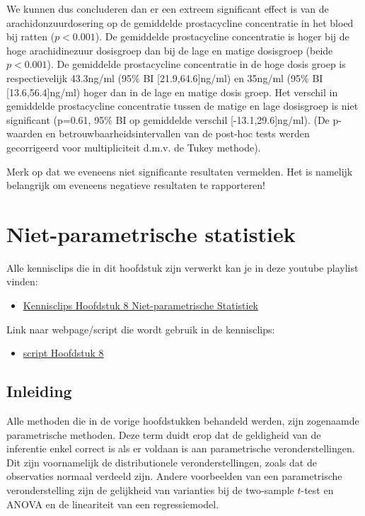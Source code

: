 \documentclass[
  12pt,dutch,coursenotes]{book}
\providecommand{\tightlist}{%
  \setlength{\itemsep}{0pt}\setlength{\parskip}{0pt}}
\theoremstyle{definition}
\theoremstyle{definition}
\theoremstyle{definition}
\theoremstyle{definition}
\theoremstyle{remark}
\begin{document}
We kunnen dus concluderen dan er een extreem significant effect is van de arachidonzuurdosering op de gemiddelde prostacycline concentratie in het bloed bij ratten (\(p<0.001\)).
De gemiddelde prostacycline concentratie is hoger bij de hoge arachidinezuur dosisgroep dan bij de lage en matige dosisgroep (beide \(p<0.001\)).
De gemiddelde prostacycline concentratie in de hoge dosis groep is respectievelijk 43.3ng/ml (95\% BI {[}21.9,64.6{]}ng/ml) en 35ng/ml (95\% BI {[}13.6,56.4{]}ng/ml) hoger dan in de lage en matige dosis groep.
Het verschil in gemiddelde prostacycline concentratie tussen de matige en lage dosisgroep is niet significant (p=0.61, 95\% BI op gemiddelde verschil {[}-13.1,29.6{]}ng/ml).
(De p-waarden en betrouwbaarheidsintervallen van de post-hoc tests werden gecorrigeerd voor multipliciteit d.m.v. de Tukey methode).

Merk op dat we eveneens niet significante resultaten vermelden. Het is namelijk belangrijk om eveneens negatieve resultaten te rapporteren!

\hypertarget{niet-parametrische-statistiek}{%
\chapter{Niet-parametrische statistiek}\label{niet-parametrische-statistiek}}

Alle kennisclips die in dit hoofdstuk zijn verwerkt kan je in deze youtube playlist vinden:

\begin{itemize}
\tightlist
\item
  \href{https://www.youtube.com/playlist?list=PLZH1hP8_LbJJyR4mqLOxDwwOzysbhaFm1}{Kennisclips Hoofdstuk 8 Niet-parametrische Statistiek}
\end{itemize}

Link naar webpage/script die wordt gebruik in de kennisclips:

\begin{itemize}
\tightlist
\item
  \href{https://statomics.github.io/sbc21/rmd/08-NonparametericStatistics.html}{script Hoofdstuk 8}
\end{itemize}

\hypertarget{inleiding-7}{%
\section{Inleiding}\label{inleiding-7}}

Alle methoden die in de vorige hoofdstukken behandeld werden, zijn zogenaamde parametrische methoden. Deze term duidt erop dat de geldigheid van de inferentie enkel correct is als er voldaan is aan parametrische veronderstellingen.
Dit zijn voornamelijk de distributionele veronderstellingen, zoals dat de observaties normaal verdeeld zijn. Andere
voorbeelden van een parametrische veronderstelling zijn de gelijkheid van varianties bij de two-sample \(t\)-test en ANOVA en de lineariteit van een regressiemodel.
\end{document}
